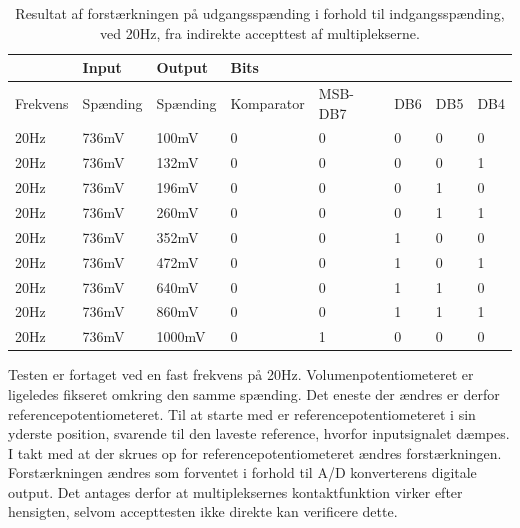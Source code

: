 \begin{table}[H]
\centering
\begin{tabular}{|l|l|l|l|l|l|l|l|}
\hline
& Input & Output & Bits &  &  &  &  \\ \hline
Frekvens & Spænding & Spænding & Komparator & MSB-DB7 & DB6 & DB5 & DB4 \\ \hline
20Hz & 736mV & 100mV & 0 & 0 & 0 & 0 & 0 \\ \hline
20Hz & 736mV & 132mV & 0 & 0 & 0 & 0 & 1 \\ \hline
20Hz & 736mV & 196mV & 0 & 0 & 0 & 1 & 0 \\ \hline
20Hz & 736mV & 260mV & 0 & 0 & 0 & 1 & 1 \\ \hline
20Hz & 736mV & 352mV & 0 & 0 & 1 & 0 & 0 \\ \hline
20Hz & 736mV & 472mV & 0 & 0 & 1 & 0 & 1 \\ \hline
20Hz & 736mV & 640mV & 0 & 0 & 1 & 1 & 0 \\ \hline
20Hz & 736mV & 860mV & 0 & 0 & 1 & 1 & 1 \\ \hline
20Hz & 736mV & 1000mV & 0 & 1 & 0 & 0 & 0 \\ \hline
\end{tabular}
\caption{Resultat af forstærkningen på udgangsspænding i forhold til indgangsspænding, ved 20Hz, fra indirekte accepttest af multiplekserne.}
\label{tab:multiplekserIgen}
\end{table}
\noindent
Testen er fortaget ved en fast frekvens på 20Hz. Volumenpotentiometeret er ligeledes fikseret omkring den samme spænding. Det eneste der ændres er derfor referencepotentiometeret. Til at starte med er referencepotentiometeret i sin yderste position, svarende til den laveste reference, hvorfor inputsignalet dæmpes. I takt med at der skrues op for referencepotentiometeret ændres forstærkningen. Forstærkningen ændres som forventet i forhold til A/D konverterens digitale output. Det antages derfor at multipleksernes kontaktfunktion virker efter hensigten, selvom accepttesten ikke direkte kan verificere dette.
